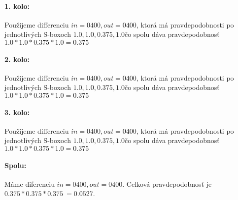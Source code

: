 \paragraph{1. kolo:}
Použijeme differenciu $in= 0400 , out= 0400 $,
ktorá má pravdepodobnosti po jednotlivých S-boxoch $
1.0,1.0,0.375,1.0
$čo spolu dáva pravdepodobnosť 
$ 1.0*1.0*0.375*1.0 = 0.375 $

\paragraph{2. kolo:}
Použijeme differenciu $in= 0400 , out= 0400 $,
ktorá má pravdepodobnosti po jednotlivých S-boxoch $
1.0,1.0,0.375,1.0
$čo spolu dáva pravdepodobnosť 
$ 1.0*1.0*0.375*1.0 = 0.375 $

\paragraph{3. kolo:}
Použijeme differenciu $in= 0400 , out= 0400 $,
ktorá má pravdepodobnosti po jednotlivých S-boxoch $
1.0,1.0,0.375,1.0
$čo spolu dáva pravdepodobnosť 
$ 1.0*1.0*0.375*1.0 = 0.375 $

\paragraph{Spolu:}  Máme diferenciu $in= 0400 , out= 0400 $.
Celková pravdepodobnosť je $ 0.375*0.375*0.375 ~= 0.0527 $.
